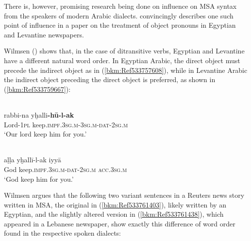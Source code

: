 \documentclass[output=paper]{langsci/langscibook}
\begin{document}
There is, however, promising research being done on influence on MSA syntax from the speakers of modern Arabic dialects. \citet{Wilmsen2010} convincingly describes one such point of influence in a paper on the treatment of object pronouns in Egyptian and Levantine newspapers.

Wilmsen (\citeyear[104]{Wilmsen2010}) shows that, in the case of ditransitive verbs, Egyptian and Levantine have a different natural word order. In Egyptian Arabic, the direct object must precede the indirect object as in (\ref{bkm:Ref533757608}), while in Levantine Arabic the indirect object preceding the direct object is preferred, as shown in (\ref{bkm:Ref533759667}):

\ea
{}\\
\gll rabbi-na yḫalli\textbf{{}-hū-l-ak}\\
     Lord-\textsc{1pl} keep\textsc{.impf.3sg.m}{}-3\textsc{sg.m-dat-2sg.m}\\
\glt ‘Our lord keep him for you.’
\z

\ea\label{ex:vanputten:}
{}\\
\gll aḷḷa yḫallī-l-ak iyyā\\
     God keep\textsc{.impf.3sg.m-dat-2sg.m} \textsc{acc.}3\textsc{sg.m} \\
\glt ‘God keep him for you.’\z

Wilmsen argues that the following two variant sentences in a Reuters news story written in MSA, the original in (\ref{bkm:Ref533761403}), likely written by an Egyptian, and the slightly altered version in (\ref{bkm:Ref533761438}), which appeared in a Lebanese newspaper, show exactly this difference of word order found in the respective spoken dialects:
\end{document}
